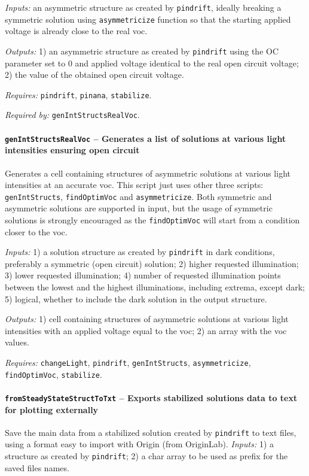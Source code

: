 		\textit{Inputs:} an asymmetric structure as created by \texttt{pindrift}, ideally
    breaking a symmetric solution using \texttt{asymmetricize} function so that
    the starting applied voltage is already close to the real \gls{voc}.
    
\textit{Outputs:} 1) an asymmetric structure as created by \texttt{pindrift} using the OC
     parameter set to 0 and applied voltage identical to the real open
     circuit voltage;
2) the value of the obtained open circuit voltage.

\textit{Requires:} \texttt{pindrift}, \texttt{pinana}, \texttt{stabilize}.

\textit{Required by:} \texttt{gen\-Int\-Structs\-Real\-Voc}.

		\paragraph{\texttt{gen\-Int\-Structs\-Real\-Voc} -- Generates a list of solutions at various light intensities ensuring open circuit}
		Generates a cell containing structures of asymmetric solutions at various light intensities at an accurate \gls{voc}.
		This script just uses other three scripts: \texttt{gen\-Int\-Structs}, \texttt{find\-Optim\-Voc}
		 and \texttt{asymmetricize}. Both symmetric and asymmetric solutions are supported in input, but the usage of symmetric solutions is strongly encouraged as the \texttt{find\-Optim\-Voc} will start from a condition closer to the \gls{voc}.
		
				\textit{Inputs:} 1) a solution structure as created by \texttt{pindrift} in dark
				     conditions, preferably a symmetric (open circuit) solution;
				2) higher requested illumination;
				3) lower requested illumination;
				4) number of requested illumination points between the lowest and the highest illuminations, including extrema, except dark;
				5) logical, whether to include the dark solution in the output
				     structure.
				
		\textit{Outputs:} 1) cell containing structures of asymmetric solutions at various light
		     intensities with an applied voltage equal to the \gls{voc};
		2) an array with the \gls{voc} values.
		
		\textit{Requires:} \texttt{change\-Light}, \texttt{pindrift}, \texttt{gen\-Int\-Structs},
		   \texttt{asymmetricize}, \texttt{find\-Optim\-Voc}, \texttt{stabilize}.
		   
		
		\paragraph{\texttt{fromSteadyStateStructToTxt} -- Exports stabilized solutions data to text for plotting externally}
		Save the main data from a stabilized solution created by \texttt{pindrift} to text files, using a format easy to import with Origin (from OriginLab).
				\textit{Inputs:} 1) a structure as created by \texttt{pindrift};
				2) a char array to be used as prefix for the saved files names.

